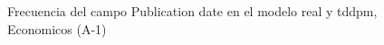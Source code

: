 \begin{figure}[H]
    \centering
    
    \caption{Frecuencia del campo Publication date en el modelo real y tddpm, Economicos (A-1)}
    \label{frecuency-Publication Date-tddpm_mlp}
\end{figure}